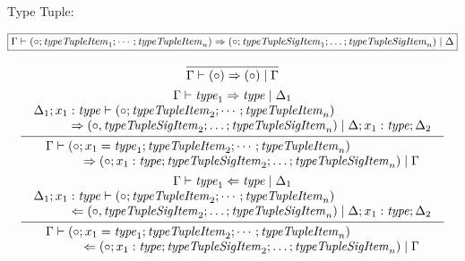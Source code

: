 Type Tuple:

$\fbox{$\Gamma \vdash (\circ; \mathit{typeTupleItem}_1; \cdots; \mathit{typeTupleItem}_n) \Rightarrow (\circ; \mathit{typeTupleSigItem}_1; \ldots; \mathit{typeTupleSigItem}_n) \mid \Delta$}$

\begin{gather*}
  \infer{\Gamma \vdash (\circ) \Rightarrow (\circ) \mid \Gamma}{}
  \\
  \infer{
    \begin{array}{l}
      \Gamma \vdash (\circ; x_1 = \mathit{type}_1; \mathit{typeTupleItem}_2; \cdots; \mathit{typeTupleItem}_n)
      \\
      \hspace{3em}\Rightarrow (\circ; x_1: \mathit{type}; \mathit{typeTupleSigItem}_2; \ldots; \mathit{typeTupleSigItem}_n) \mid \Gamma
    \end{array}
  }{
    \begin{array}{c}
      \Gamma \vdash \mathit{type}_1 \Rightarrow \mathit{type} \mid \Delta_1
      \\
      \begin{array}{l}
        \Delta_1; x_1: \mathit{type} \vdash (\circ; \mathit{typeTupleItem}_2; \cdots; \mathit{typeTupleItem}_n)
        \\
        \hspace{3em}\Rightarrow (\circ, \mathit{typeTupleSigItem}_2; \ldots; \mathit{typeTupleSigItem}_n) \mid \Delta; x_1: \mathit{type}; \Delta_2
      \end{array}
    \end{array}
  }
  \\
  \infer{
    \begin{array}{l}
      \Gamma \vdash (\circ; x_1 = \mathit{type}_1; \mathit{typeTupleItem}_2; \cdots; \mathit{typeTupleItem}_n)
      \\
      \hspace{3em}\Leftarrow (\circ; x_1: \mathit{type}; \mathit{typeTupleSigItem}_2; \ldots; \mathit{typeTupleSigItem}_n) \mid \Gamma
    \end{array}
  }{
    \begin{array}{c}
      \Gamma \vdash \mathit{type}_1 \Leftarrow \mathit{type} \mid \Delta_1
      \\
      \begin{array}{l}
        \Delta_1; x_1: \mathit{type} \vdash (\circ; \mathit{typeTupleItem}_2; \cdots; \mathit{typeTupleItem}_n)
        \\
        \hspace{3em}\Leftarrow (\circ, \mathit{typeTupleSigItem}_2; \ldots; \mathit{typeTupleSigItem}_n) \mid \Delta; x_1: \mathit{type}; \Delta_2

\end{array}
\end{array}}
\end{gather*}
